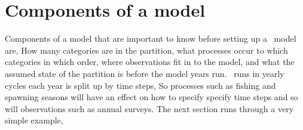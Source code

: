 \section{Components of a model}\label{Sec:comp}

Components of a model that are important to know before setting up a \CNAME\ model are, How many categories are in the partition, what processes occur to which categories in which order, where observations fit in to the model, and what the assumed state of the partition is before the model years run. \CNAME\ runs in yearly cycles each year is split up by time steps, So processes such as fishing and spawning seasons will have an effect on how to specify specify time steps and so will observations such as annual surveys. The next section runs through a very simple example,


